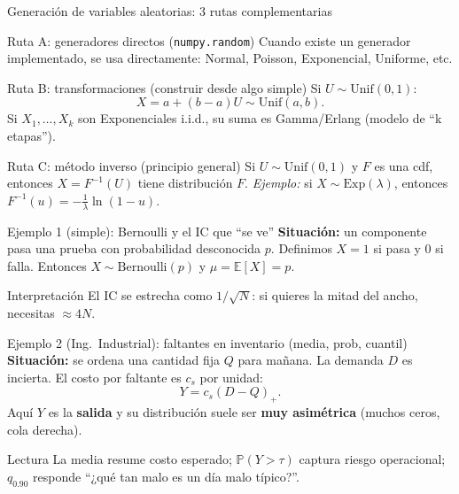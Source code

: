 \documentclass[aspectratio=1610, 9pt]{beamer}
\begin{document}
\begin{frame}{Generación de variables aleatorias: 3 rutas complementarias}
\begin{block}{Ruta A: generadores directos (\texttt{numpy.random})}
Cuando existe un generador implementado, se usa directamente: Normal, Poisson, Exponencial, Uniforme, etc.
\end{block}

\begin{block}{Ruta B: transformaciones (construir desde algo simple)}
Si $U\sim \mathrm{Unif}(0,1)$:
\[
X=a+(b-a)U \sim \mathrm{Unif}(a,b).
\]
Si $X_1,\dots,X_k$ son Exponenciales i.i.d., su suma es Gamma/Erlang (modelo de ``k etapas'').
\end{block}

\begin{block}{Ruta C: método inverso (principio general)}
Si $U\sim\mathrm{Unif}(0,1)$ y $F$ es una cdf, entonces $X=F^{-1}(U)$ tiene distribución $F$.
\emph{Ejemplo:} si $X\sim\mathrm{Exp}(\lambda)$, entonces $F^{-1}(u)=-\frac{1}{\lambda}\ln(1-u)$.
\end{block}
\end{frame}

\begin{frame}[fragile]{Ejemplo 1 (simple): Bernoulli y el IC que ``se ve''}
\textbf{Situación:} un componente pasa una prueba con probabilidad desconocida $p$.
Definimos $X=1$ si pasa y $0$ si falla. Entonces $X\sim \mathrm{Bernoulli}(p)$ y $\mu=\mathbb E[X]=p$.


\begin{block}{Interpretación}
El IC se estrecha como $1/\sqrt{N}$: si quieres la mitad del ancho, necesitas $\approx 4N$.
\end{block}
\end{frame}

\begin{frame}[fragile]{Ejemplo 2 (Ing.\ Industrial): faltantes en inventario (media, prob, cuantil)}
\textbf{Situación:} se ordena una cantidad fija $Q$ para mañana. La demanda $D$ es incierta.
El costo por faltante es $c_s$ por unidad:
\[
Y=c_s(D-Q)_+.
\]
Aquí $Y$ es la \textbf{salida} y su distribución suele ser \textbf{muy asimétrica} (muchos ceros, cola derecha).


\begin{alertblock}{Lectura}
La media resume costo esperado; $\mathbb P(Y>\tau)$ captura riesgo operacional; $q_{0.90}$ responde ``¿qué tan malo es un día malo típico?''.
\end{alertblock}
\end{frame}
\end{document}
